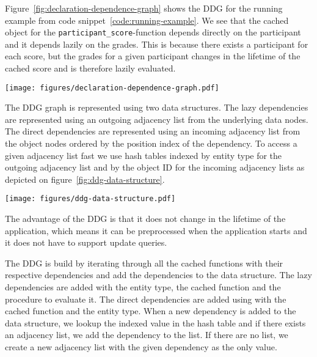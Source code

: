 Figure~\ref{fig:declaration-dependence-graph} shows the DDG for the running example from code snippet~\ref{code:running-example}. We see that the cached object for the \verb$participant_score$-function depends directly on the participant and it depends lazily on the grades. This is because there exists a participant for each score, but the grades for a given participant changes in the lifetime of the cached score and is therefore lazily evaluated.

\begin{figure*}[ht!]
  \centering
  \texttt{[image: figures/declaration-dependence-graph.pdf]}
  \caption{The Declaration Dependence Graph of the running example}
  \label{fig:declaration-dependence-graph}
\end{figure*}

The DDG graph is represented using two data structures. The lazy dependencies are represented using an outgoing adjacency list from the underlying data nodes. The direct dependencies are represented using an incoming adjacency list from the object nodes ordered by the position index of the dependency. To access a given adjacency list fast we use hash tables indexed by entity type for the outgoing adjacency list and by the object ID for the incoming adjacency lists as depicted on figure~\ref{fig:ddg-data-structure}.

\begin{figure*}[ht!]
  \centering
  \texttt{[image: figures/ddg-data-structure.pdf]}
  \caption{An illustration of the data structure representing the DDG on figure~\ref{fig:declaration-dependence-graph}}
  \label{fig:ddg-data-structure}
\end{figure*}

The advantage of the DDG is that it does not change in the lifetime of the application, which means it can be preprocessed when the application starts and it does not have to support update queries.

The DDG is build by iterating through all the cached functions with their respective dependencies and add the dependencies to the data structure. The lazy dependencies are added with the entity type, the cached function and the procedure to evaluate it. The direct dependencies are added using with the cached function and the entity type. When a new dependency is added to the data structure, we lookup the indexed value in the hash table and if there exists an adjacency list, we add the dependency to the list. If there are no list, we create a new adjacency list with the given dependency as the only value.

